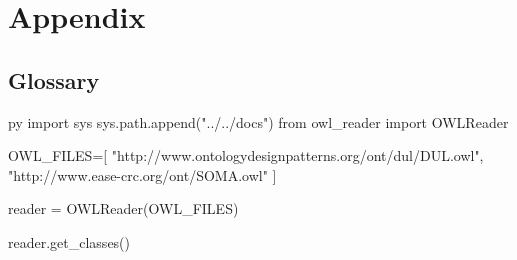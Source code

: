 \chapter{Appendix}
\label{app:complete_pub_list}
\section{Glossary}
\label{appendix:section1}

\pagestyle{fancy} 

\newcommand{\appendixstyle}[2]{\textbf{#1}\markboth{#1}{#1}\ {#2}}

\begin{pythontexcustomcode}{py}
import sys
sys.path.append("../../docs")
from owl_reader import OWLReader

OWL_FILES=[
    "http://www.ontologydesignpatterns.org/ont/dul/DUL.owl",
    "http://www.ease-crc.org/ont/SOMA.owl"
]

reader = OWLReader(OWL_FILES)
\end{pythontexcustomcode}

\begin{multicols}{2}

\begin{pycode}
reader.get_classes()
\end{pycode}

\end{multicols}
